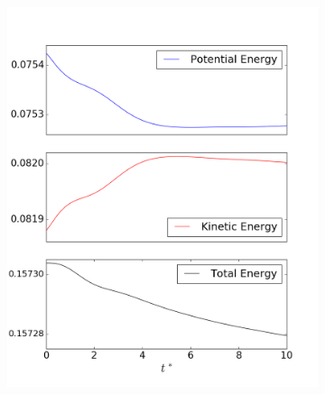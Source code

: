 \documentclass[review]{elsarticle}
\begin{document}
\begin{figure}[!htb]
    \centering
    \begin{subfigure}[b]{0.45\textwidth}
        \includegraphics[width=\textwidth]{_fig/soliton_energy.png}
        \caption{}
        \label{fig:soliton_energy}
    \end{subfigure}
    \begin{subfigure}[b]{0.45\textwidth}

\end{subfigure}
\end{figure}
\end{document}
